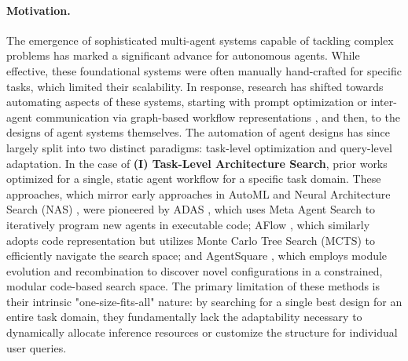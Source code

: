 \documentclass{article} %
\begin{document}
\paragraph{Motivation.} 
The emergence of sophisticated multi-agent systems capable of tackling complex problems \citep{wu2023autogen, li2023camel, hong2023metagpt} has marked a significant advance for autonomous agents. While effective, these foundational systems were often manually hand-crafted for specific tasks, which limited their scalability. In response, research has shifted towards automating aspects of these systems, starting with prompt optimization \citep{khattab2023dspy, yuksekgonul2024textgrad, yang2023large} or inter-agent communication via graph-based workflow representations \citep{zhuge2024gptswarm, liu2023dynamic, zhang2024gdesigner}, and then, to the designs of agent systems themselves. The automation of agent designs has since largely split into two distinct paradigms: task-level optimization and query-level adaptation. In the case of \textbf{(I) Task-Level Architecture Search}, prior works optimized for a single, static agent workflow for a specific task domain. These approaches, which mirror early approaches in AutoML and Neural Architecture Search (NAS) \citep{elsken2019neural}, were pioneered by ADAS \citep{hu2024automated}, which uses Meta Agent Search to iteratively program new agents in executable code; AFlow \citep{zhang2024aflow}, which similarly adopts code representation but utilizes Monte Carlo Tree Search (MCTS) to efficiently navigate the search space; and AgentSquare \citep{shang2024agentsquare}, which employs module evolution and recombination to discover novel configurations in a constrained, modular code-based search space. The primary limitation of these methods is their intrinsic "one-size-fits-all" nature: by searching for a single best design for an entire task domain, they fundamentally lack the adaptability necessary to dynamically allocate inference resources or customize the structure for individual user queries. 
\end{document}
